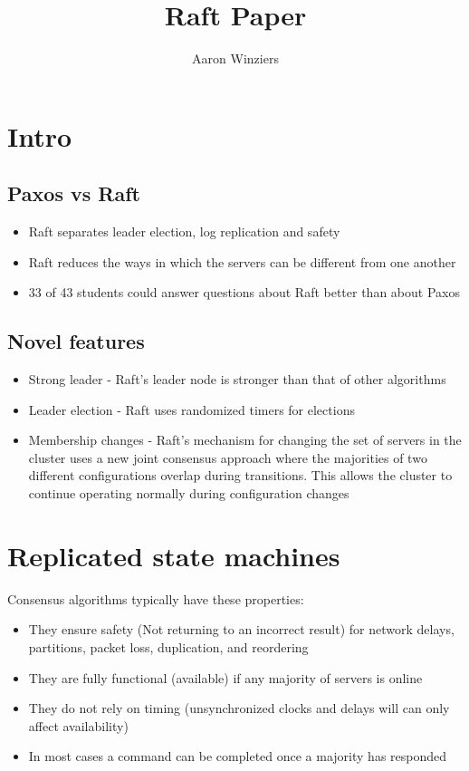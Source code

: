 \documentclass[10pt,a4paper]{article}
\author{Aaron Winziers}
\title{Raft Paper}
\begin{document}
\section{Intro}
	\subsection{Paxos vs Raft}
	\begin{itemize}
		\item Raft separates leader election, log replication and safety
		\item Raft reduces the ways in which the servers can be different from one another
		\item 33 of 43 students could answer questions about Raft better than about Paxos
	\end{itemize}
	\subsection{Novel features}
	\begin{itemize}
		\item Strong leader - Raft's leader node is stronger than that of other algorithms
		\item Leader election - Raft uses randomized timers for elections
		\item Membership changes - Raft’s mechanism for	changing the set of servers in the cluster uses a new joint consensus approach where the majorities of two different configurations overlap during transitions. This allows the cluster to continue operating normally during configuration changes
	\end{itemize}
\section{Replicated state machines}
	Consensus algorithms typically have these properties:
	\begin{itemize}
		\item They ensure safety (Not returning to an incorrect result) for network delays, partitions, packet loss, duplication, and reordering
		\item They are fully functional (available) if any majority of servers is online
		\item They do not rely on timing (unsynchronized clocks and delays will can only affect availability)
		\item In most cases a command can be completed once a majority has responded
	\end{itemize}
\end{document}
